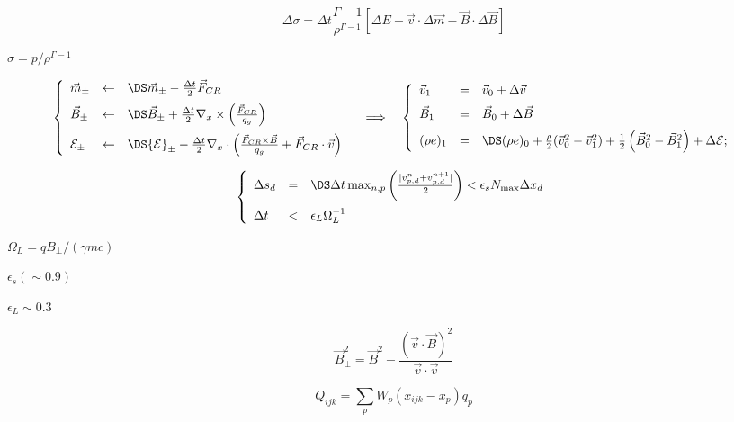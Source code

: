 \documentclass{article}
\begin{document}
\[
         \Delta\sigma = \Delta t\frac{\Gamma-1}{\rho^{\Gamma-1}}
                        \left[\Delta E - \vec{v}\cdot\Delta\vec{m}
                                       - \vec{B}\cdot\Delta{\vec{B}}
                                       \right]
      \]
\pagebreak

$\sigma = p/\rho^{\Gamma-1}$
\pagebreak

\[
   \left\{\begin{array}{lcl}
     \vec{m}_\pm &\leftarrow& \DS
     \vec{m}_\pm - \frac{\Delta t}{2}\vec{F}_{CR}
     \\ \noalign{\medskip}
     \vec{B}_\pm &\leftarrow& \DS
     \vec{B}_\pm + \frac{\Delta t}{2}\nabla_x\times
                   \left(\frac{\vec{F}_{CR}}{q_g}\right)
     \\ \noalign{\medskip}
     {\cal E}_\pm &\leftarrow& \DS
     {\cal E}_\pm - \frac{\Delta t}{2}\nabla_x\cdot
     \left(\frac{\vec{F}_{CR}\times\vec{B}}{q_g} + \vec{F}_{CR}\cdot\vec{v}\right)
   \end{array}\right.
   \quad\Longrightarrow\quad
   \left\{\begin{array}{lcl}
     \vec{v}_1  &=& \vec{v}_0 + \Delta\vec{v}
     \\ \noalign{\medskip}
     \vec{B}_1  &=& \vec{B}_0 + \Delta\vec{B}
     \\ \noalign{\medskip}
     (\rho e)_1 &=& \DS (\rho e)_0 + \frac{\rho}{2}(\vec{v}_0^2 - \vec{v}_1^2)
     + \frac{1}{2}\left(\vec{B}_0^2-\vec{B}_1^2\right) + \Delta {\cal E};
   \end{array}\right.
\]
\pagebreak

\[
 \left\{
   \begin{array}{lcl}
     \Delta s_d &=& \DS\Delta t\max_{n,p}\left(
                    \frac{|v_{p,d}^n + v_{p,d}^{n+1}|}{2}\right)
                 < \epsilon_s N_{\max}\Delta x_d \\ \noalign{\medskip}
     \Delta t  &<& \epsilon_L \Omega_L^{-1}
   \end{array}
 \right.
\]
\pagebreak

$ \Omega_L = qB_\perp/(\gamma m c) $
\pagebreak

$\epsilon_s (\sim 0.9)$
\pagebreak

$\epsilon_L\sim 0.3$
\pagebreak

\[
 \vec{B}^2_\perp = \vec{B}^2 - \frac{(\vec{v}\cdot\vec{B})^2}
                                    {\vec{v}\cdot\vec{v}}                                
\]
\pagebreak

\[
   Q_{ijk} = \sum_p W_p(x_{ijk}-x_p)q_p
\]
\pagebreak
\end{document}
